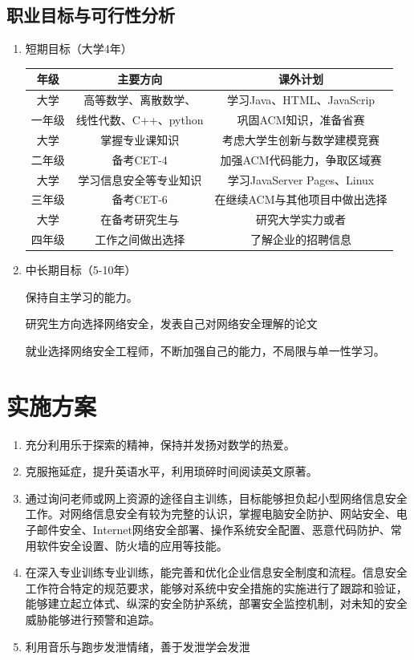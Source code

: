 \documentclass{article}
\begin{document}
\subsection{职业目标与可行性分析}
\begin{enumerate}[(1)]
	\item 短期目标（大学4年）
	\begin{table}[h]
		\centering 
		\begin{tabular}{|c|c|c|}
			\hline
			年级 & 主要方向 & 课外计划\\
			\hline
			大学 & 高等数学、离散数学、 & 学习Java、HTML、JavaScrip\\
			一年级 &  线性代数、C++、python & 巩固ACM知识，准备省赛 \\ 
			\hline
			大学 & 掌握专业课知识 & 考虑大学生创新与数学建模竞赛\\
			二年级 & 备考CET-4 &  加强ACM代码能力，争取区域赛\\
			\hline
			大学 & 学习信息安全等专业知识 & 学习JavaServer Pages、Linux \\
			三年级 & 备考CET-6 & 在继续ACM与其他项目中做出选择 \\
			\hline
			大学 & 在备考研究生与 & 研究大学实力或者 \\
			四年级 & 工作之间做出选择 & 了解企业的招聘信息 \\
			\hline
		\end{tabular}
	\end{table}
	\item 中长期目标（5-10年）\par
	保持自主学习的能力。\par
	研究生方向选择网络安全，发表自己对网络安全理解的论文 \par
	就业选择网络安全工程师，不断加强自己的能力，不局限与单一性学习。\par
\end{enumerate}


\section{实施方案}
\begin{enumerate}[1、]
	\item 充分利用乐于探索的精神，保持并发扬对数学的热爱。
	\item 克服拖延症，提升英语水平，利用琐碎时间阅读英文原著。
	\item 通过询问老师或网上资源的途径自主训练，目标能够担负起小型网络信息安全工作。对网络信息安全有较为完整的认识，掌握电脑安全防护、网站安全、电子邮件安全、Internet网络安全部署、操作系统安全配置、恶意代码防护、常用软件安全设置、防火墙的应用等技能。
	\item 在深入专业训练专业训练，能完善和优化企业信息安全制度和流程。信息安全工作符合特定的规范要求，能够对系统中安全措施的实施进行了跟踪和验证，能够建立起立体式、纵深的安全防护系统，部署安全监控机制，对未知的安全威胁能够进行预警和追踪。
	\item 利用音乐与跑步发泄情绪，善于发泄学会发泄
\end{enumerate}
\par 
\end{document}
